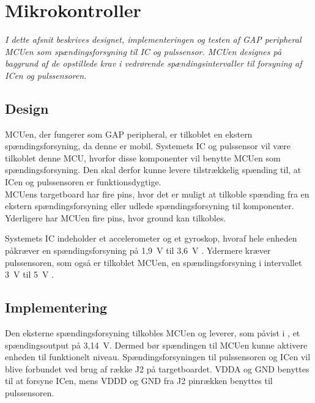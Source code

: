\section{Mikrokontroller}
\textit{I dette afsnit beskrives designet, implementeringen og testen af GAP peripheral MCUen som spændingsforsyning til IC og pulssensor. MCUen designes på baggrund af de opstillede krav i  vedrørende spændingsintervaller til forsyning af ICen og pulssensoren.}


\subsection{Design}
MCUen, der fungerer som GAP peripheral, er tilkoblet en ekstern spændingsforsyning, da denne er mobil. Systemets IC og pulssensor vil være tilkoblet denne MCU, hvorfor disse komponenter vil benytte MCUen som spændingsforsyning. Den skal derfor kunne levere tilstrækkelig spænding til, at ICen og pulssensoren er funktionsdygtige. \\
MCUens targetboard har fire pins, hvor det er muligt at tilkoble spænding fra en ekstern spændingsforsyning eller udlede spændingsforsyning til komponenter. Yderligere har MCUen fire pins, hvor ground kan tilkobles. \citep{Semiconductor2016}

Systemets IC indeholder et accelerometer og et gyroskop, hvoraf hele enheden påkræver en spændingsforsyning på 1,9~V til 3,6~V \citep{Jimb02016}. Ydermere kræver pulssensoren, som også er tilkoblet MCUen, en spændingsforsyning i intervallet 3~V til 5~V \citep{Murphy2016}.

\subsection{Implementering}
Den eksterne spændingsforsyning tilkobles MCUen og leverer, som påvist i , et spændingsoutput på 3,14~V. Dermed bør spændingen til MCUen kunne aktivere enheden til funktionelt niveau. %
Spændingsforsyningen til pulssensoren og ICen vil blive forbundet ved brug af række J2 på targetboardet. VDDA og GND benyttes til at forsyne ICen, mens VDDD og GND fra J2 pinrækken benyttes til pulssensoren.

